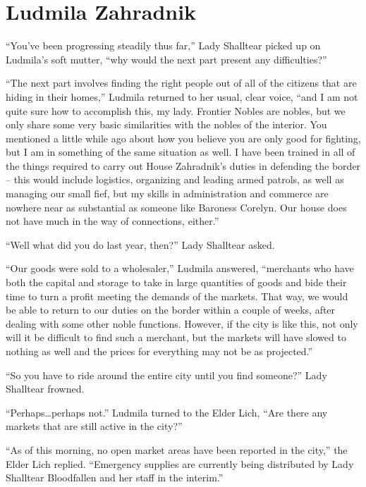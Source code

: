 \chapter{Ludmila Zahradnik}

“You’ve been progressing steadily thus far,” Lady Shalltear picked up on Ludmila’s soft mutter, “why would the next part present any difficulties?”

 

“The next part involves finding the right people out of all of the citizens that are hiding in their homes,” Ludmila returned to her usual, clear voice, “and I am not quite sure how to accomplish this, my lady. Frontier Nobles are nobles, but we only share some very basic similarities with the nobles of the interior. You mentioned a little while ago about how you believe you are only good for fighting, but I am in something of the same situation as well. I have been trained in all of the things required to carry out House Zahradnik’s duties in defending the border – this would include logistics, organizing and leading armed patrols, as well as managing our small fief, but my skills in administration and commerce are nowhere near as substantial as someone like Baroness Corelyn. Our house does not have much in the way of connections, either.”

 

“Well what did you do last year, then?” Lady Shalltear asked.

 

“Our goods were sold to a wholesaler,” Ludmila answered, “merchants who have both the capital and storage to take in large quantities of goods and bide their time to turn a profit meeting the demands of the markets. That way, we would be able to return to our duties on the border within a couple of weeks, after dealing with some other noble functions. However, if the city is like this, not only will it be difficult to find such a merchant, but the markets will have slowed to nothing as well and the prices for everything may not be as projected.”

 

“So you have to ride around the entire city until you find someone?” Lady Shalltear frowned.

 

“Perhaps…perhaps not.” Ludmila turned to the Elder Lich, “Are there any markets that are still active in the city?”

 

“As of this morning, no open market areas have been reported in the city,” the Elder Lich replied. “Emergency supplies are currently being distributed by Lady Shalltear Bloodfallen and her staff in the interim.”


